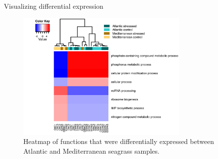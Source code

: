 \documentclass[presentation]{beamer}
\begin{document}
\begin{frame}[label=sec-4-1-3]{Visualizing differential expression}
\begin{figure}[htb]
\centering
\includegraphics[width=8.5cm]{20140521_t9HeatMapCluster.png}
\caption{Heatmap of functions that were differentially expressed between Atlantic and Mediterranean seagrass samples.}
\end{figure}
\end{frame}
\end{document}
